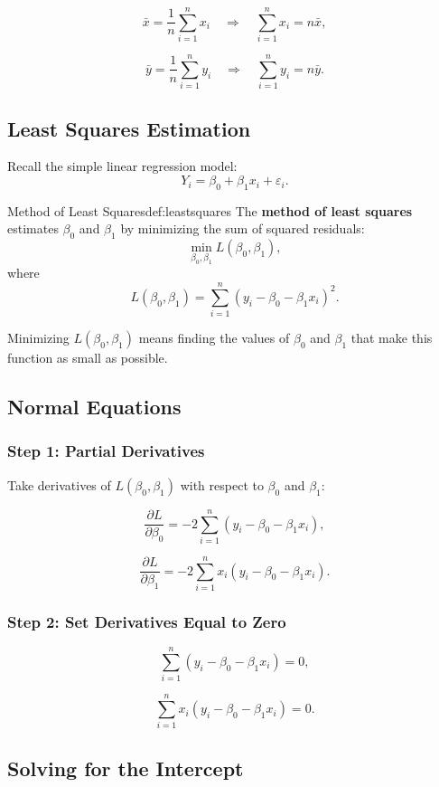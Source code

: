 \[
\bar{x} = \frac{1}{n}\sum_{i=1}^n x_i
\quad \Rightarrow \quad
\sum_{i=1}^n x_i = n\bar{x},
\]

\[
\bar{y} = \frac{1}{n}\sum_{i=1}^n y_i
\quad \Rightarrow \quad
\sum_{i=1}^n y_i = n\bar{y}.
\]

\subsection{Least Squares Estimation}

Recall the simple linear regression model:
\[
Y_i = \beta_0 + \beta_1 x_i + \varepsilon_i.
\]

\begin{defn}{Method of Least Squares}{def:leastsquares}
The \textbf{method of least squares} estimates $\beta_0$ and $\beta_1$ by minimizing the sum of squared residuals:
\[
\min_{\beta_0,\beta_1} L(\beta_0,\beta_1),
\]
where
\[
L(\beta_0,\beta_1) = \sum_{i=1}^n (y_i - \beta_0 - \beta_1 x_i)^2.
\]
\end{defn}

Minimizing $L(\beta_0,\beta_1)$ means finding the values of $\beta_0$ and $\beta_1$ that make this function as small as possible.

\subsection{Normal Equations}

\subsubsection*{Step 1: Partial Derivatives}

Take derivatives of $L(\beta_0,\beta_1)$ with respect to $\beta_0$ and $\beta_1$:

\[
\frac{\partial L}{\partial \beta_0}
=
-2\sum_{i=1}^n (y_i - \beta_0 - \beta_1 x_i),
\]

\[
\frac{\partial L}{\partial \beta_1}
=
-2\sum_{i=1}^n x_i (y_i - \beta_0 - \beta_1 x_i).
\]

\subsubsection*{Step 2: Set Derivatives Equal to Zero}

\[
\sum_{i=1}^n (y_i - \beta_0 - \beta_1 x_i) = 0,
\]

\[
\sum_{i=1}^n x_i (y_i - \beta_0 - \beta_1 x_i) = 0.
\]

\subsection{Solving for the Intercept}

